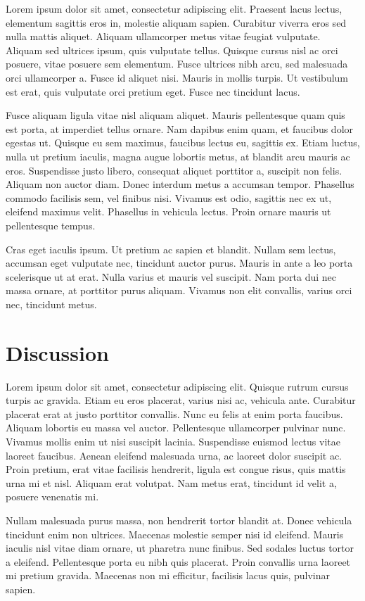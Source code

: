 \documentclass[10pt, onecolumn]{revtex4}    %
\begin{document}
Lorem ipsum dolor sit amet, consectetur adipiscing elit. Praesent lacus lectus, elementum sagittis eros in, molestie aliquam sapien. Curabitur viverra eros sed nulla mattis aliquet. Aliquam ullamcorper metus vitae feugiat vulputate. Aliquam sed ultrices ipsum, quis vulputate tellus. Quisque cursus nisl ac orci posuere, vitae posuere sem elementum. Fusce ultrices nibh arcu, sed malesuada orci ullamcorper a. Fusce id aliquet nisi. Mauris in mollis turpis. Ut vestibulum est erat, quis vulputate orci pretium eget. Fusce nec tincidunt lacus.

Fusce aliquam ligula vitae nisl aliquam aliquet. Mauris pellentesque quam quis est porta, at imperdiet tellus ornare. Nam dapibus enim quam, et faucibus dolor egestas ut. Quisque eu sem maximus, faucibus lectus eu, sagittis ex. Etiam luctus, nulla ut pretium iaculis, magna augue lobortis metus, at blandit arcu mauris ac eros. Suspendisse justo libero, consequat aliquet porttitor a, suscipit non felis. Aliquam non auctor diam. Donec interdum metus a accumsan tempor. Phasellus commodo facilisis sem, vel finibus nisi. Vivamus est odio, sagittis nec ex ut, eleifend maximus velit. Phasellus in vehicula lectus. Proin ornare mauris ut pellentesque tempus.

Cras eget iaculis ipsum. Ut pretium ac sapien et blandit. Nullam sem lectus, accumsan eget vulputate nec, tincidunt auctor purus. Mauris in ante a leo porta scelerisque ut at erat. Nulla varius et mauris vel suscipit. Nam porta dui nec massa ornare, at porttitor purus aliquam. Vivamus non elit convallis, varius orci nec, tincidunt metus.

\section{Discussion} 

Lorem ipsum dolor sit amet, consectetur adipiscing elit. Quisque rutrum cursus turpis ac gravida. Etiam eu eros placerat, varius nisi ac, vehicula ante. Curabitur placerat erat at justo porttitor convallis. Nunc eu felis at enim porta faucibus. Aliquam lobortis eu massa vel auctor. Pellentesque ullamcorper pulvinar nunc. Vivamus mollis enim ut nisi suscipit lacinia. Suspendisse euismod lectus vitae laoreet faucibus. Aenean eleifend malesuada urna, ac laoreet dolor suscipit ac. Proin pretium, erat vitae facilisis hendrerit, ligula est congue risus, quis mattis urna mi et nisl. Aliquam erat volutpat. Nam metus erat, tincidunt id velit a, posuere venenatis mi.

Nullam malesuada purus massa, non hendrerit tortor blandit at. Donec vehicula tincidunt enim non ultrices. Maecenas molestie semper nisi id eleifend. Mauris iaculis nisl vitae diam ornare, ut pharetra nunc finibus. Sed sodales luctus tortor a eleifend. Pellentesque porta eu nibh quis placerat. Proin convallis urna laoreet mi pretium gravida. Maecenas non mi efficitur, facilisis lacus quis, pulvinar sapien.
\end{document}

